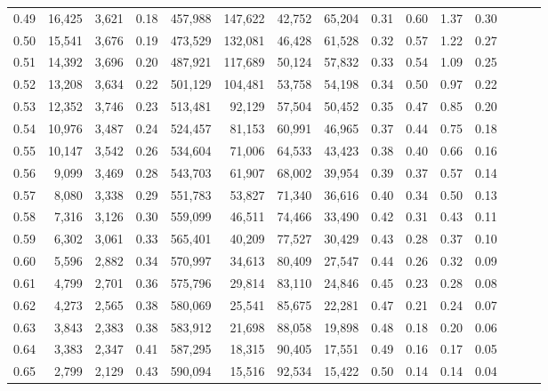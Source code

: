 \begin{tabular}{rrrrrrrrrrrrrrr}
0.49 &  16,425 &  3,621 &  0.18 &  457,988 &  147,622 &   42,752 &   65,204 &  0.31 &  0.60 &  1.37 &      0.30 \\
0.50 &  15,541 &  3,676 &  0.19 &  473,529 &  132,081 &   46,428 &   61,528 &  0.32 &  0.57 &  1.22 &      0.27 \\
0.51 &  14,392 &  3,696 &  0.20 &  487,921 &  117,689 &   50,124 &   57,832 &  0.33 &  0.54 &  1.09 &      0.25 \\
0.52 &  13,208 &  3,634 &  0.22 &  501,129 &  104,481 &   53,758 &   54,198 &  0.34 &  0.50 &  0.97 &      0.22 \\
0.53 &  12,352 &  3,746 &  0.23 &  513,481 &   92,129 &   57,504 &   50,452 &  0.35 &  0.47 &  0.85 &      0.20 \\
0.54 &  10,976 &  3,487 &  0.24 &  524,457 &   81,153 &   60,991 &   46,965 &  0.37 &  0.44 &  0.75 &      0.18 \\
0.55 &  10,147 &  3,542 &  0.26 &  534,604 &   71,006 &   64,533 &   43,423 &  0.38 &  0.40 &  0.66 &      0.16 \\
0.56 &   9,099 &  3,469 &  0.28 &  543,703 &   61,907 &   68,002 &   39,954 &  0.39 &  0.37 &  0.57 &      0.14 \\
0.57 &   8,080 &  3,338 &  0.29 &  551,783 &   53,827 &   71,340 &   36,616 &  0.40 &  0.34 &  0.50 &      0.13 \\
0.58 &   7,316 &  3,126 &  0.30 &  559,099 &   46,511 &   74,466 &   33,490 &  0.42 &  0.31 &  0.43 &      0.11 \\
0.59 &   6,302 &  3,061 &  0.33 &  565,401 &   40,209 &   77,527 &   30,429 &  0.43 &  0.28 &  0.37 &      0.10 \\
0.60 &   5,596 &  2,882 &  0.34 &  570,997 &   34,613 &   80,409 &   27,547 &  0.44 &  0.26 &  0.32 &      0.09 \\
0.61 &   4,799 &  2,701 &  0.36 &  575,796 &   29,814 &   83,110 &   24,846 &  0.45 &  0.23 &  0.28 &      0.08 \\
0.62 &   4,273 &  2,565 &  0.38 &  580,069 &   25,541 &   85,675 &   22,281 &  0.47 &  0.21 &  0.24 &      0.07 \\
0.63 &   3,843 &  2,383 &  0.38 &  583,912 &   21,698 &   88,058 &   19,898 &  0.48 &  0.18 &  0.20 &      0.06 \\
0.64 &   3,383 &  2,347 &  0.41 &  587,295 &   18,315 &   90,405 &   17,551 &  0.49 &  0.16 &  0.17 &      0.05 \\
0.65 &   2,799 &  2,129 &  0.43 &  590,094 &   15,516 &   92,534 &   15,422 &  0.50 &  0.14 &  0.14 &      0.04 \\

\end{tabular}
